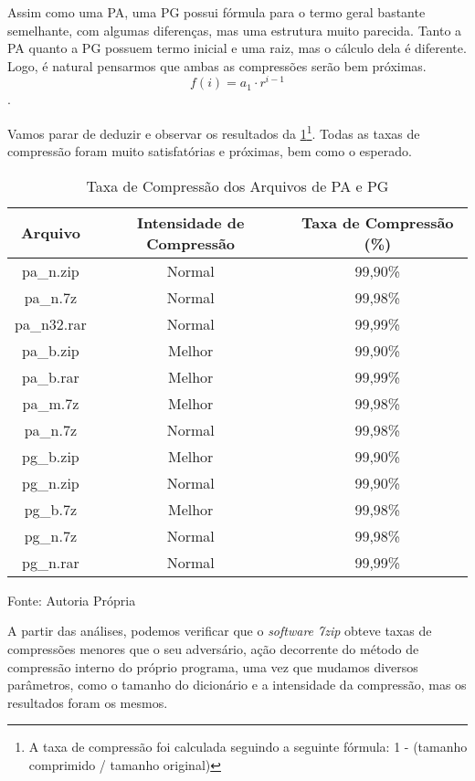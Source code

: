 \hspace{1.5cm} Assim como uma PA, uma PG possui fórmula para o termo geral bastante semelhante, com algumas diferenças, mas uma estrutura muito parecida. Tanto a PA quanto a PG possuem termo inicial e uma raiz, mas o cálculo dela é diferente. Logo, é natural pensarmos que ambas as compressões serão bem próximas.  \begin{equation*} f(i) = a_1 \cdot r^{i-1} \end{equation*}.

\hspace{1.5 cm} Vamos parar de deduzir e observar os resultados da \ref{tab:compressão_papg}\footnote{A taxa de compressão foi calculada seguindo a seguinte fórmula: 1 - (tamanho comprimido / tamanho original)}. Todas as taxas de compressão foram muito satisfatórias e próximas, bem como o esperado.

\begin{table}[htbp]
    \centering
    \caption{Taxa de Compressão dos Arquivos de PA e PG}
    \label{tab:compressão_papg}
    \begin{tabular}{c|c|c}
    \hline
    \textbf{Arquivo} & \textbf{Intensidade de Compressão} & \textbf{Taxa de Compressão (\%)} \\ \hline
    pa\_n.zip & Normal & 99,90\% \\ \hline
    pa\_n.7z & Normal & 99,98\% \\ \hline
    pa\_n32.rar & Normal & 99,99\% \\ \hline
    pa\_b.zip & Melhor & 99,90\% \\ \hline
    pa\_b.rar & Melhor & 99,99\% \\ \hline
    pa\_m.7z & Melhor & 99,98\% \\ \hline
    pa\_n.7z & Normal & 99,98\% \\ \hline
    pg\_b.zip & Melhor & 99,90\% \\ \hline
    pg\_n.zip & Normal & 99,90\% \\ \hline
    pg\_b.7z & Melhor & 99,98\% \\ \hline
    pg\_n.7z & Normal & 99,98\% \\ \hline
    pg\_n.rar & Normal & 99,99\% \\ \hline
    \end{tabular}

    Fonte: Autoria Própria
\end{table}

\hspace{1.5 cm} A partir das análises, podemos verificar que o \textit{software 7zip} obteve taxas de compressões menores que o seu adversário, ação decorrente do método de compressão interno do próprio programa, uma vez que mudamos diversos parâmetros, como o tamanho do dicionário e a intensidade da compressão, mas os resultados foram os mesmos.

